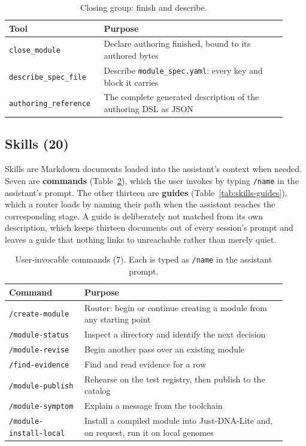 \documentclass[11pt,a4paper]{article}
\begin{document}
\begin{table}[ht]
\centering
\scriptsize
\caption{Closing group: finish and describe.}
\label{tab:tools-closing}
\begin{tabular}{@{}p{0.30\linewidth}p{0.62\linewidth}@{}}
\toprule
Tool & Purpose \\
\midrule
\texttt{close\_module}        & Declare authoring finished, bound to its authored bytes \\
\texttt{describe\_spec\_file} & Describe \texttt{module\_spec.yaml}: every key and block it carries \\
\texttt{authoring\_reference} & The complete generated description of the authoring DSL as JSON \\
\bottomrule
\end{tabular}
\end{table}

\subsection*{Skills (20)}

Skills are Markdown documents loaded into the assistant's context when
needed. Seven are \textbf{commands} (Table~\ref{tab:skills-commands}), which the user invokes by typing \texttt{/name} in
the assistant's prompt. The other thirteen are \textbf{guides} (Table~\ref{tab:skills-guides}), which a router
loads by naming their path when the assistant reaches the corresponding
stage.
A guide is deliberately not matched from its own description, which keeps thirteen documents out of every session's prompt and leaves a guide that nothing links to unreachable rather than merely quiet.

\begin{table}[ht]
\centering
\scriptsize
\caption{User-invocable commands (7). Each is typed as
\texttt{/name} in the assistant prompt.}
\label{tab:skills-commands}
\begin{tabular}{@{}p{0.25\linewidth}p{0.67\linewidth}@{}}
\toprule
Command & Purpose \\
\midrule
\texttt{/create-module}         & Router: begin or continue creating a module from any starting point \\
\texttt{/module-status}         & Inspect a directory and identify the next decision \\
\texttt{/module-revise}         & Begin another pass over an existing module \\
\texttt{/find-evidence}         & Find and read evidence for a row \\
\texttt{/module-publish}        & Rehearse on the test registry, then publish to the catalog \\
\texttt{/module-symptom}        & Explain a message from the toolchain \\
\texttt{/module-install-local}  & Install a compiled module into Just-DNA-Lite and, on request, run it on local genomes \\
\bottomrule
\end{tabular}
\end{table}
\end{document}
